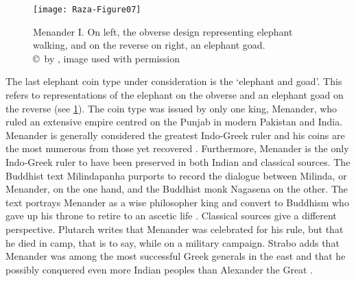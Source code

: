 \documentclass{ijsra}
\begin{document}
\begin{figure}[!htb] %
	\centering
	\texttt{[image: Raza-Figure07]}
	\caption{Menander I. On left, the obverse design representing elephant walking, and on the reverse on right, an elephant goad.
		{\normalfont\scriptsize \\ \copyright\ by \autocite{Coin}, image used with permission}}
	\label{fig:Raza-Figure07}
\end{figure}

The last elephant coin type under consideration is the ‘elephant and goad’.
This refers to representations of the elephant on the obverse and an elephant goad on the reverse (see \cref{fig:Raza-Figure07}). 
The coin type was issued by only one king, Menander, who ruled an extensive empire centred on the Punjab in modern Pakistan and India. 
Menander is generally considered the greatest Indo-Greek ruler and his coins are the most numerous from those yet recovered \parencite[14--17]{Bopearachchi1993}.
Furthermore, Menander is the only Indo-Greek ruler to have been preserved in both Indian and classical sources. 
The Buddhist text Milindapanha purports to record the dialogue between Milinda, or Menander, on the one hand,
and the Buddhist monk Nagasena on the other. 
The text portrays Menander as a wise philosopher king and convert to Buddhism who gave up his throne to retire to an ascetic life
\parencite[14--17]{Bopearachchi1993}. 
Classical sources give a different perspective.
Plutarch writes that Menander was celebrated for his rule, but that he died in camp, that is to say, while on a military campaign. 
Strabo adds that Menander was among the most successful Greek generals in the east and that he possibly conquered even more
Indian peoples than Alexander the Great \parencite[180, 183]{Holt1999}.
\end{document}
